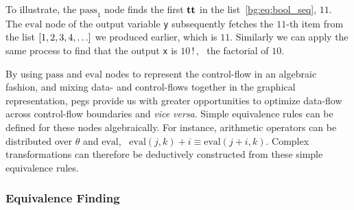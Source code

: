 To illustrate, the $\mathrm{pass}_1$ node finds the first $\mathbf{tt}$ in the
list~\eqref{bg:eq:bool_seq}, $11$.  The $\mathrm{eval}$ node of the output
variable \verb|y| subsequently fetches the $11$-th item from the list $[1, 2,
3, 4, \mathellipsis]$ we produced earlier, which is $11$.  Similarly we can
apply the same process to find that the output \verb|x| is \mbox{$10\,!\,$},
\ie~the factorial of $10$.

By using $\mathrm{pass}$ and $\mathrm{eval}$ nodes to represent the
control-flow in an algebraic fashion, and mixing data- and control-flows
together in the graphical representation, \glspl{peg} provide us with
greater opportunities to optimize data-flow across control-flow boundaries
and \emph{vice versa}.  Simple equivalence rules can be defined for these
nodes algebraically.  For instance, arithmetic operators can be distributed
over $\theta$ and $\mathrm{eval}$, \eg~$\mathrm{eval}(j, k) + i \equiv
\mathrm{eval}(j + i, k)$.  Complex transformations can therefore be deductively
constructed from these simple equivalence rules.

\subsubsection{Equivalence Finding}

